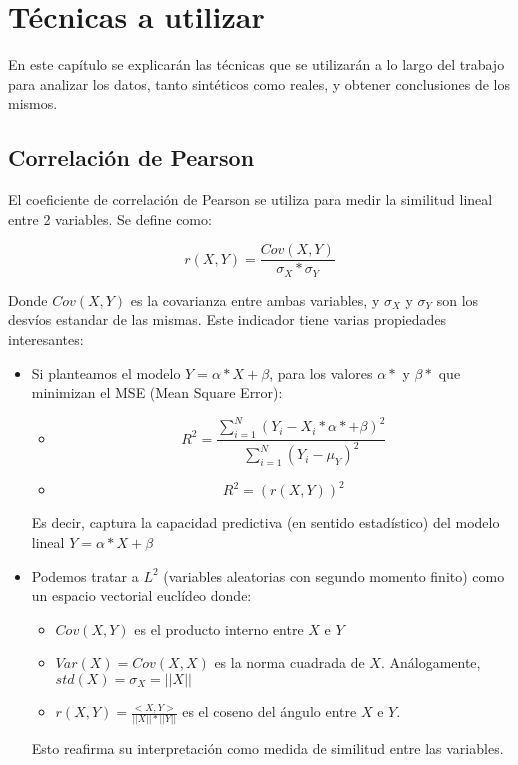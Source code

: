 \chapter{Técnicas a utilizar} \label{chapter:tecnicas_a_utilizar}

En este capítulo se explicarán las técnicas que se utilizarán a lo largo del trabajo para analizar los datos, tanto sintéticos como reales, y obtener conclusiones de los mismos.

\section{Correlación de Pearson}

El coeficiente de correlación de Pearson se utiliza para medir la similitud lineal entre 2 variables. Se define como:

$$
    r(X,Y) = \frac{Cov(X,Y)}{\sigma_X * \sigma_Y}
$$

Donde $Cov(X,Y)$ es la covarianza entre ambas variables, y $\sigma_X$ y $\sigma_Y$ son los desvíos estandar de las mismas. Este indicador tiene varias propiedades interesantes:

\begin{itemize}
    \item Si planteamos el modelo $Y = \alpha * X + \beta$, para los valores $\alpha*$ y $\beta*$ que minimizan el MSE (Mean Square Error):
        \begin{itemize}
            \item $$ R^2 = \frac{\sum_{i=1}^{N} (Y_i - X_i * \alpha* + \beta)^2} {\sum_{i=1}^{N} (Y_i - \mu_Y)^2} $$
            \item $$ R^2 = (r(X,Y))^2 $$
        \end{itemize}

        Es decir, captura la capacidad predictiva (en sentido estadístico) del modelo lineal $Y = \alpha * X + \beta$
    \item Podemos tratar a $L^2$ (variables aleatorias con segundo momento finito) como un espacio vectorial euclídeo donde:
        \begin{itemize}
            \item $Cov(X,Y)$ es el producto interno entre $X$ e $Y$
            \item $Var(X) = Cov(X,X)$ es la norma cuadrada de $X$. Análogamente, $std(X) = \sigma_X = ||X||$
            \item $ r(X,Y) = \frac{<X,Y>}{||X|| * ||Y||} $ es el coseno del ángulo entre $X$ e $Y$.
        \end{itemize}

        Esto reafirma su interpretación como medida de similitud entre las variables.
\end{itemize}


